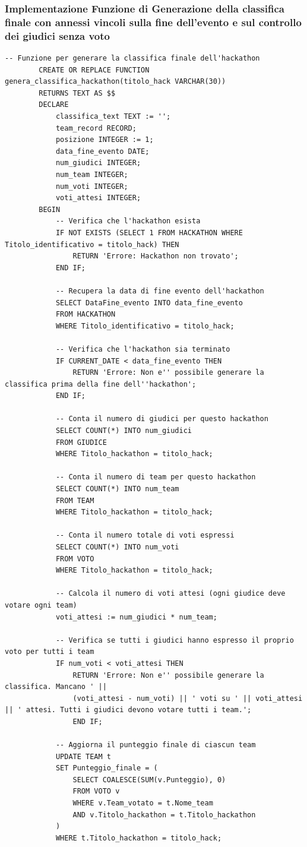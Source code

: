 \documentclass[a4paper, 11pt]{article}
\begin{document}
	\subsubsection{Implementazione Funzione di Generazione della classifica finale con annessi vincoli sulla fine dell'evento e sul controllo dei giudici senza voto}
	\begin{lstlisting}[style=sqlstyle]
		-- Funzione per generare la classifica finale dell'hackathon
		CREATE OR REPLACE FUNCTION genera_classifica_hackathon(titolo_hack VARCHAR(30))
		RETURNS TEXT AS $$
		DECLARE
			classifica_text TEXT := '';
			team_record RECORD;
			posizione INTEGER := 1;
			data_fine_evento DATE;
			num_giudici INTEGER;
			num_team INTEGER;
			num_voti INTEGER;
			voti_attesi INTEGER;
		BEGIN
			-- Verifica che l'hackathon esista
			IF NOT EXISTS (SELECT 1 FROM HACKATHON WHERE Titolo_identificativo = titolo_hack) THEN
				RETURN 'Errore: Hackathon non trovato';
			END IF;
			
			-- Recupera la data di fine evento dell'hackathon
			SELECT DataFine_evento INTO data_fine_evento
			FROM HACKATHON
			WHERE Titolo_identificativo = titolo_hack;
			
			-- Verifica che l'hackathon sia terminato
			IF CURRENT_DATE < data_fine_evento THEN
				RETURN 'Errore: Non e'' possibile generare la classifica prima della fine dell''hackathon';
			END IF;
			
			-- Conta il numero di giudici per questo hackathon
			SELECT COUNT(*) INTO num_giudici
			FROM GIUDICE
			WHERE Titolo_hackathon = titolo_hack;
			
			-- Conta il numero di team per questo hackathon
			SELECT COUNT(*) INTO num_team
			FROM TEAM
			WHERE Titolo_hackathon = titolo_hack;
			
			-- Conta il numero totale di voti espressi
			SELECT COUNT(*) INTO num_voti
			FROM VOTO
			WHERE Titolo_hackathon = titolo_hack;
			
			-- Calcola il numero di voti attesi (ogni giudice deve votare ogni team)
			voti_attesi := num_giudici * num_team;
			
			-- Verifica se tutti i giudici hanno espresso il proprio voto per tutti i team
			IF num_voti < voti_attesi THEN
				RETURN 'Errore: Non e'' possibile generare la classifica. Mancano ' || 
				(voti_attesi - num_voti) || ' voti su ' || voti_attesi || ' attesi. Tutti i giudici devono votare tutti i team.';
				END IF;
			
			-- Aggiorna il punteggio finale di ciascun team
			UPDATE TEAM t
			SET Punteggio_finale = (
				SELECT COALESCE(SUM(v.Punteggio), 0)
				FROM VOTO v
				WHERE v.Team_votato = t.Nome_team
				AND v.Titolo_hackathon = t.Titolo_hackathon
			)
			WHERE t.Titolo_hackathon = titolo_hack;
			

\end{lstlisting}
\end{document}
